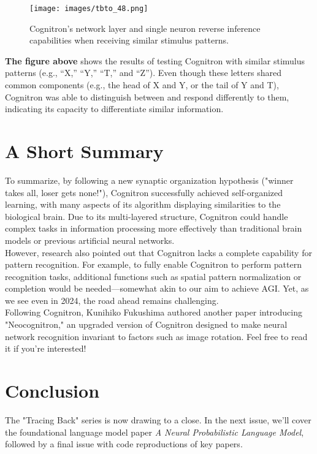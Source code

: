 \documentclass[11p,oneside]{book}
\begin{document}
\begin{figure}[H]
    \centering
    \texttt{[image: images/tbto\_48.png]}
    \caption{Cognitron’s network layer and single neuron reverse inference capabilities when receiving similar stimulus patterns.}
\end{figure}

\textbf{The figure above} shows the results of testing Cognitron with similar stimulus patterns (e.g., “X,” “Y,” “T,” and “Z”). Even though these letters shared common components (e.g., the head of X and Y, or the tail of Y and T), Cognitron was able to distinguish between and respond differently to them, indicating its capacity to differentiate similar information.

\section*{A Short Summary}

To summarize, by following a new synaptic organization hypothesis ("winner takes all, loser gets none!"), Cognitron successfully achieved self-organized learning, with many aspects of its algorithm displaying similarities to the biological brain. Due to its multi-layered structure, Cognitron could handle complex tasks in information processing more effectively than traditional brain models or previous artificial neural networks. \\

However, research also pointed out that Cognitron lacks a complete capability for pattern recognition. For example, to fully enable Cognitron to perform pattern recognition tasks, additional functions such as spatial pattern normalization or completion would be needed—somewhat akin to our aim to achieve AGI. Yet, as we see even in 2024, the road ahead remains challenging. \\

Following Cognitron, Kunihiko Fukushima authored another paper introducing "Neocognitron," an upgraded version of Cognitron designed to make neural network recognition invariant to factors such as image rotation. Feel free to read it if you’re interested!

\section*{Conclusion}

The "Tracing Back" series is now drawing to a close. In the next issue, we’ll cover the foundational language model paper \textit{A Neural Probabilistic Language Model}, followed by a final issue with code reproductions of key papers. \\
\end{document}
